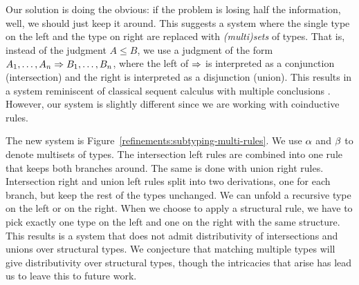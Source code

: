 Our solution is doing the obvious: if the problem is losing half the information, well, we should just keep it around. This suggests a system where the single type on the left and the type on right are replaced with \emph{(multi)sets} of types. That is, instead of the judgment $A \le B$, we use a judgment of the form $A_1, \ldots, A_n \mathrel\Rightarrow B_1, \ldots, B_n$, where the left of $\mathrel\Rightarrow$ is interpreted as a conjunction (intersection) and the right is interpreted as a disjunction (union). This results in a system reminiscent of classical sequent calculus with multiple conclusions \cite{Gentzen35, Girard87}. However, our system is slightly different since we are working with coinductive rules.

The new system is Figure~\ref{refinements:subtyping-multi-rules}. We use $\alpha$ and $\beta$ to denote multisets of types. The intersection left rules are combined into one rule that keeps both branches around. The same is done with union right rules. Intersection right and union left rules split into two derivations, one for each branch, but keep the rest of the types unchanged. We can unfold a recursive type on the left or on the right. When we choose to apply a structural rule, we have to pick exactly one type on the left and one on the right with the same structure. This results is a system that does not admit distributivity of intersections and unions over structural types. We conjecture that matching multiple types will give distributivity over structural types, though the intricacies that arise has lead us to leave this to future work.

